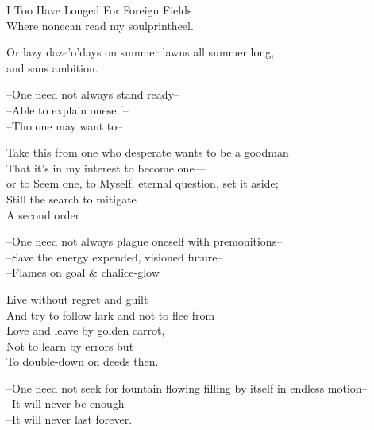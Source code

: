 
\secdiv 

I Too Have Longed For Foreign Fields \\
Where nonecan read my soulprintheel. 

Or lazy daze'o'days on summer lawns all summer long, \\
and sans ambition.

--One need not always stand ready-- \\
--Able to explain oneself-- \\
--Tho one may want to--

Take this from one who desperate wants to be a goodman \\
That it's in my interest to become one— \\
or to Seem one, to Myself, eternal question, set it aside; \\
Still the search to mitigate \\
A second order  

--One need not always plague oneself with premonitions-- \\
--Save the energy expended, visioned future-- \\
--Flames on goal \& chalice-glow

Live without regret and guilt \\
And try to follow lark and not to flee from \\
Love and leave by golden carrot, \\
Not to learn by errors but \\
To double-down on deeds then.

--One need not seek for fountain flowing filling by itself in endless motion-- \\
--It will never be enough-- \\
--It will never last forever. 